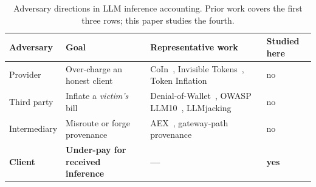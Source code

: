 \begin{table}[t]
\caption{Adversary directions in LLM inference accounting. Prior work covers the first
three rows; this paper studies the fourth.}
\label{tab:quadrant}
\centering
\begin{tabular}{llll}
\toprule
Adversary & Goal & Representative work & Studied here \\
\midrule
Provider & Over-charge an honest client & CoIn~\cite{coin}, Invisible Tokens~\cite{invisible}, Token Inflation~\cite{tokeninflation} & no \\
Third party & Inflate a \emph{victim's} bill & Denial-of-Wallet~\cite{dow,dowreview}, OWASP LLM10~\cite{owasp}, LLMjacking~\cite{llmjacking} & no \\
Intermediary & Misroute or forge provenance & AEX~\cite{aex}, gateway-path provenance~\cite{gwprov} & no \\
\textbf{Client} & \textbf{Under-pay for received inference} & \textbf{---} & \textbf{yes} \\
\bottomrule
\end{tabular}
\end{table}
